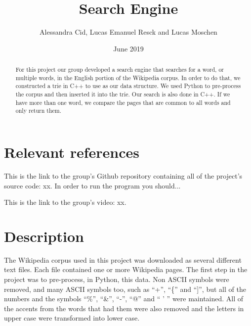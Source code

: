 \documentclass{article}
\title{Search Engine}
\author{Alessandra Cid, Lucas Emanuel Resck  
and Lucas Moschen}
\date{June 2019}
\begin{document}
\maketitle

\begin{abstract}
For this project our group developed a search engine that searches for a word, or multiple words, in the English portion of the Wikipedia corpus. In order to do that, we constructed a trie in C++ to use as our data structure. We used Python to pre-process the corpus and then inserted it into the trie. Our search is also done in C++. If we have more than one word, we compare the pages that are common to all words and only return them. 
\end{abstract}

\section*{Relevant references}
This is the link to the group's Github repository containing all of the project's 
source code: xx. In order to run the program you should...

This is the link to the group's video: xx. 

\section*{Description}
The Wikipedia corpus used in this project was downloaded as several different text files. Each file contained one or more Wikipedia pages. The first step in the project was to pre-process, in Python, this data. Non ASCII symbols were removed, and many ASCII symbols too, such as ``+'', ``\{'' and ``]'', but all of the numbers and the symbols ``\%'', ``\&'', ``-'', ``@'' and `` ' '' were maintained. All of the accents from the words that had them were also removed and the letters in upper case were transformed into lower case. 
\end{document}
